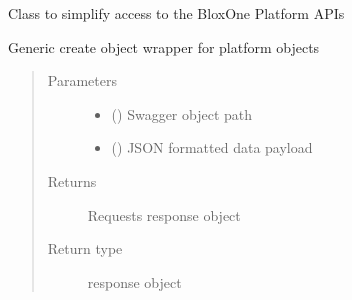 \documentclass[letterpaper,10pt,english]{sphinxmanual}
\begin{document}
\begin{fulllineitems}
\label{\detokenize{b1anycast-class:bloxone.b1anycast}}
\sphinxAtStartPar
Class to simplify access to the BloxOne Platform APIs

\begin{fulllineitems}
\label{\detokenize{b1anycast-class:bloxone.b1anycast.create}}
\sphinxAtStartPar
Generic create object wrapper for platform objects
\begin{quote}\begin{description}
\item[{Parameters}] \leavevmode\begin{itemize}
\item {} 
\sphinxAtStartPar
{} () \textendash{} Swagger object path

\item {} 
\sphinxAtStartPar
{} () \textendash{} JSON formatted data payload

\end{itemize}

\item[{Returns}] \leavevmode
\sphinxAtStartPar
Requests response object

\item[{Return type}] \leavevmode
\sphinxAtStartPar
response object

\end{description}\end{quote}

\end{fulllineitems}



\end{fulllineitems}
\end{document}
